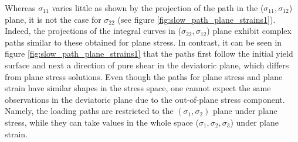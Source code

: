 Whereas $\sigma_{11}$ varies little as shown by the projection of the path in the ($\sigma_{11},\sigma_{12}$) plane, it is not the case for $\sigma_{22}$ (see figure \ref{fig:slow_path_plane_strains1}).
Indeed, the projections of the integral curves in ($\sigma_{22},\sigma_{12}$) plane exhibit complex paths similar to these obtained for plane stress.
In contrast, it can be seen in figure \ref{fig:slow_path_plane_strains1} that the paths first follow the initial yield surface and next a direction of pure shear in the deviatoric plane, which differs from plane stress solutions.
Even though the paths for plane stress and plane strain have similar shapes in the stress space, one cannot expect the same observations in the deviatoric plane due to the out-of-plane stress component.
Namely, the loading paths are restricted to the $(\sigma_1,\sigma_2)$ plane under plane stress, while they can take values in the whole space ($\sigma_1,\sigma_2,\sigma_3$) under plane strain.

